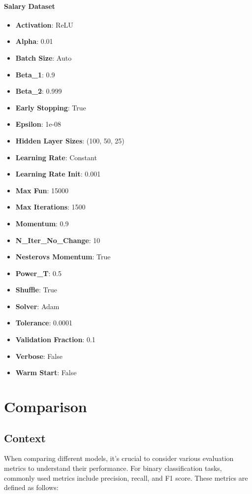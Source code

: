 \documentclass[a4paper,12pt]{article}
\begin{document}
\paragraph{Salary Dataset}
\begin{itemize}
    \item \textbf{Activation}: ReLU
    \item \textbf{Alpha}: 0.01
    \item \textbf{Batch Size}: Auto
    \item \textbf{Beta\_1}: 0.9
    \item \textbf{Beta\_2}: 0.999
    \item \textbf{Early Stopping}: True
    \item \textbf{Epsilon}: 1e-08
    \item \textbf{Hidden Layer Sizes}: (100, 50, 25)
    \item \textbf{Learning Rate}: Constant
    \item \textbf{Learning Rate Init}: 0.001
    \item \textbf{Max Fun}: 15000
    \item \textbf{Max Iterations}: 1500
    \item \textbf{Momentum}: 0.9
    \item \textbf{N\_Iter\_No\_Change}: 10
    \item \textbf{Nesterovs Momentum}: True
    \item \textbf{Power\_T}: 0.5
    \item \textbf{Shuffle}: True
    \item \textbf{Solver}: Adam
    \item \textbf{Tolerance}: 0.0001
    \item \textbf{Validation Fraction}: 0.1
    \item \textbf{Verbose}: False
    \item \textbf{Warm Start}: False
\end{itemize}

\newpage

\section{Comparison}

\subsection{Context}
When comparing different models, it's crucial to consider various evaluation metrics to understand their performance. For binary classification tasks, commonly used metrics include precision, recall, and F1 score. These metrics are defined as follows:
\end{document}
